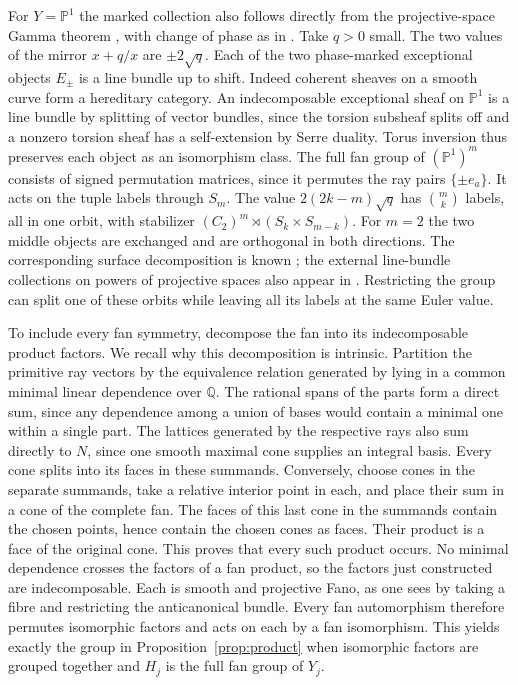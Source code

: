 For $Y=\mathbb P^1$ the marked collection also follows directly from the projective-space Gamma theorem \cite[\S5]{GGI}, with change of phase as in \cite[Remark~4.13]{GI}. Take $q>0$ small. The two values of the mirror $x+q/x$ are $\pm2\sqrt q$. Each of the two phase-marked exceptional objects $E_\pm$ is a line bundle up to shift. Indeed coherent sheaves on a smooth curve form a hereditary category. An indecomposable exceptional sheaf on $\mathbb P^1$ is a line bundle by splitting of vector bundles, since the torsion subsheaf splits off and a nonzero torsion sheaf has a self-extension by Serre duality. Torus inversion thus preserves each object as an isomorphism class. The full fan group of $(\mathbb P^1)^m$ consists of signed permutation matrices, since it permutes the ray pairs $\{\pm e_a\}$. It acts on the tuple labels through $S_m$. The value $2(2k-m)\sqrt q$ has $\binom{m}{k}$ labels, all in one orbit, with stabilizer $(C_2)^m\rtimes(S_k\times S_{m-k})$. For $m=2$ the two middle objects are exchanged and are orthogonal in both directions. The corresponding surface decomposition is known \cite[Lemma~3.15]{ESS}; the external line-bundle collections on powers of projective spaces also appear in \cite[Theorem~2.1]{Mir}. Restricting the group can split one of these orbits while leaving all its labels at the same Euler value.


To include every fan symmetry, decompose the fan into its indecomposable product factors. We recall why this decomposition is intrinsic. Partition the primitive ray vectors by the equivalence relation generated by lying in a common minimal linear dependence over $\mathbb Q$. The rational spans of the parts form a direct sum, since any dependence among a union of bases would contain a minimal one within a single part. The lattices generated by the respective rays also sum directly to $N$, since one smooth maximal cone supplies an integral basis. Every cone splits into its faces in these summands. Conversely, choose cones in the separate summands, take a relative interior point in each, and place their sum in a cone of the complete fan. The faces of this last cone in the summands contain the chosen points, hence contain the chosen cones as faces. Their product is a face of the original cone. This proves that every such product occurs. No minimal dependence crosses the factors of a fan product, so the factors just constructed are indecomposable. Each is smooth and projective Fano, as one sees by taking a fibre and restricting the anticanonical bundle. Every fan automorphism therefore permutes isomorphic factors and acts on each by a fan isomorphism. This yields exactly the group in Proposition~\ref{prop:product} when isomorphic factors are grouped together and $H_j$ is the full fan group of $Y_j$.


